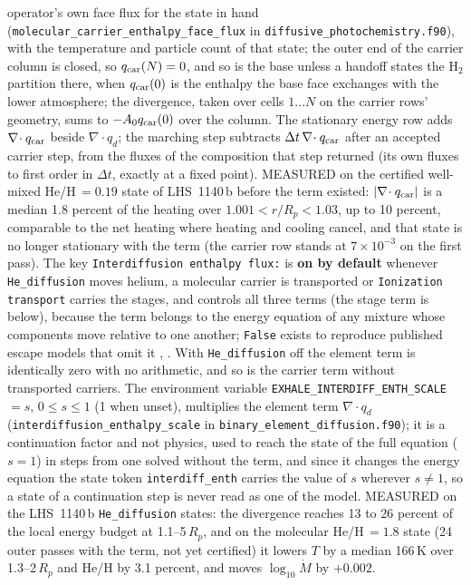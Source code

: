 operator's own face flux for the state in hand
(\texttt{molecular\_carrier\_enthalpy\_face\_flux} in
\texttt{diffusive\_photochemistry.f90}), with the temperature and particle
count of that state; the outer end of the carrier column is closed, so
$q_{\rm car}(N) = 0$, and so is the base unless a handoff states the H$_2$
partition there, when $q_{\rm car}(0)$ is the enthalpy the base face
exchanges with the lower atmosphere; the divergence, taken over cells
$1\ldots N$ on the carrier rows' geometry, sums to $-A_0q_{\rm car}(0)$ over
the column.  The
stationary energy row adds $\nabla\!\cdot q_{\rm car}$ beside $\nabla\!\cdot q_d$;
the marching step subtracts $\Delta t\,\nabla\!\cdot q_{\rm car}$ after an
accepted carrier step, from the fluxes of the composition that step returned
(its own fluxes to first order in $\Delta t$, exactly at a fixed point).
MEASURED on the certified well-mixed He/H\,$=0.19$ state of
LHS~1140\,b before the term existed: $|\nabla\!\cdot q_{\rm car}|$ is a median
1.8 percent of the heating over $1.001 < r/R_p < 1.03$, up to 10 percent,
comparable to the net heating where heating and cooling cancel, and that
state is no longer stationary with the term (the carrier row stands at
$7\times10^{-3}$ on the first pass).  The key
\texttt{Interdiffusion enthalpy flux:} is \textbf{on by default} whenever
\texttt{He\_diffusion} moves helium, a molecular carrier is transported or
\texttt{Ionization transport} carries the stages, and controls all three
terms (the stage term is below), because the term belongs to the energy
equation of any mixture whose components move relative to one another;
\texttt{False} exists to reproduce published escape models that omit it
\citep[eq.~3]{Koskinen2013}, \citep[eq.~B3]{Koskinen2022}.  With
\texttt{He\_diffusion} off the element term is identically zero with no
arithmetic, and so is the carrier term without transported carriers.
The environment variable \texttt{EXHALE\_INTERDIFF\_ENTH\_SCALE} $=s$,
$0\le s\le1$ (1 when unset), multiplies the element term
$\nabla\!\cdot q_d$ (\texttt{interdiffusion\_enthalpy\_scale} in
\texttt{binary\_element\_diffusion.f90}); it is a continuation factor and not
physics, used to reach the state of the full equation ($s=1$) in steps from
one solved without the term, and since it changes the energy equation the
state token \texttt{interdiff\_enth} carries the value of $s$ wherever
$s\ne1$, so a state of a continuation step is never read as one of the
model.
MEASURED on the LHS~1140\,b \texttt{He\_diffusion} states: the divergence
reaches 13 to 26 percent of the local energy budget at 1.1--5\,$R_p$, and on
the molecular He/H\,$=1.8$ state (24 outer passes with the term, not yet
certified) it lowers $T$ by a median 166\,K over 1.3--2\,$R_p$ and He/H by
3.1 percent, and moves $\log_{10}\dot M$ by $+0.002$.

